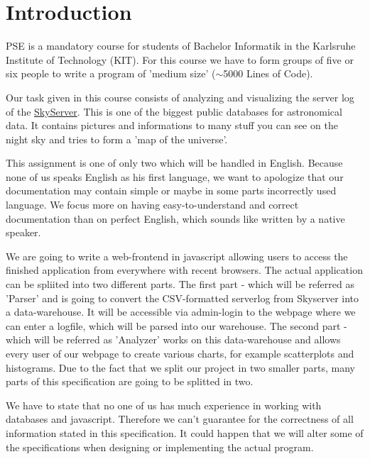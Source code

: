 \section*{Introduction}
PSE is a mandatory course for students of Bachelor Informatik in the 
Karlsruhe Institute of Technology (KIT). 
For this course we have to form groups of five or six people to write
 a program of 'medium size' ($\sim$5000 Lines of Code).

Our task given in this course consists of
analyzing and visualizing the server log of the 
\href{http://skyserver.sdss.org/public/en/}{SkyServer}.
This is one of the biggest public databases for astronomical data. 
It contains pictures and informations to many stuff you can see on the night sky
and tries to form a 'map of the universe'.

This assignment is one of only two which will be handled 
in English.
Because none of us speaks English as his first language, 
we want to apologize that our documentation may contain simple 
or maybe in some parts incorrectly used language. We focus more on 
having easy-to-understand and correct documentation 
than on perfect English, which sounds like written by a native speaker.

We are going to write a web-frontend in javascript allowing users 
to access the finished application from everywhere
with recent browsers. The actual application can be spliited into two 
different parts. The first part - which will be referred as 'Parser' and is going to convert the CSV-formatted 
serverlog from Skyserver into a data-warehouse. It will
be accessible via admin-login to the webpage where we can enter a 
logfile, which will be parsed into our warehouse.
The second part - which will be referred as 'Analyzer' works on this data-warehouse 
and allows every user of our webpage to create various charts, 
for example scatterplots and histograms.
Due to the fact that we split our project in two smaller parts, 
many parts of this specification are going to be splitted in two.

We have to state that no one of us has much experience in working 
with databases and javascript.
Therefore we can't guarantee for the correctness of all information 
stated in this specification.
It could happen that we will alter some of the specifications when designing or 
implementing the actual program.
